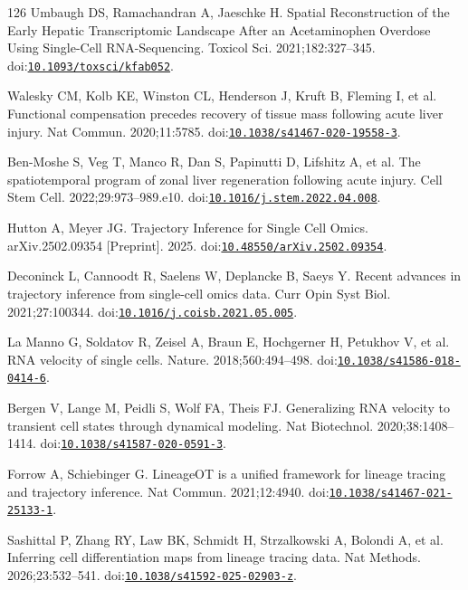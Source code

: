 \begin{thebibliography}{126}
Umbaugh DS, Ramachandran A, Jaeschke H. Spatial Reconstruction of the Early Hepatic Transcriptomic Landscape After an Acetaminophen Overdose Using Single-Cell RNA-Sequencing. Toxicol Sci. 2021;182:327--345. doi:\href{https://doi.org/10.1093/toxsci/kfab052}{\nolinkurl{10.1093/toxsci/kfab052}}.

Walesky CM, Kolb KE, Winston CL, Henderson J, Kruft B, Fleming I, et al. Functional compensation precedes recovery of tissue mass following acute liver injury. Nat Commun. 2020;11:5785. doi:\href{https://doi.org/10.1038/s41467-020-19558-3}{\nolinkurl{10.1038/s41467-020-19558-3}}.

Ben-Moshe S, Veg T, Manco R, Dan S, Papinutti D, Lifshitz A, et al. The spatiotemporal program of zonal liver regeneration following acute injury. Cell Stem Cell. 2022;29:973--989.e10. doi:\href{https://doi.org/10.1016/j.stem.2022.04.008}{\nolinkurl{10.1016/j.stem.2022.04.008}}.

Hutton A, Meyer JG. Trajectory Inference for Single Cell Omics. arXiv.2502.09354 [Preprint]. 2025. doi:\href{https://doi.org/10.48550/arXiv.2502.09354}{\nolinkurl{10.48550/arXiv.2502.09354}}.

Deconinck L, Cannoodt R, Saelens W, Deplancke B, Saeys Y. Recent advances in trajectory inference from single-cell omics data. Curr Opin Syst Biol. 2021;27:100344. doi:\href{https://doi.org/10.1016/j.coisb.2021.05.005}{\nolinkurl{10.1016/j.coisb.2021.05.005}}.

La Manno G, Soldatov R, Zeisel A, Braun E, Hochgerner H, Petukhov V, et al. RNA velocity of single cells. Nature. 2018;560:494--498. doi:\href{https://doi.org/10.1038/s41586-018-0414-6}{\nolinkurl{10.1038/s41586-018-0414-6}}.

Bergen V, Lange M, Peidli S, Wolf FA, Theis FJ. Generalizing RNA velocity to transient cell states through dynamical modeling. Nat Biotechnol. 2020;38:1408--1414. doi:\href{https://doi.org/10.1038/s41587-020-0591-3}{\nolinkurl{10.1038/s41587-020-0591-3}}.

Forrow A, Schiebinger G. LineageOT is a unified framework for lineage tracing and trajectory inference. Nat Commun. 2021;12:4940. doi:\href{https://doi.org/10.1038/s41467-021-25133-1}{\nolinkurl{10.1038/s41467-021-25133-1}}.

Sashittal P, Zhang RY, Law BK, Schmidt H, Strzalkowski A, Bolondi A, et al. Inferring cell differentiation maps from lineage tracing data. Nat Methods. 2026;23:532--541. doi:\href{https://doi.org/10.1038/s41592-025-02903-z}{\nolinkurl{10.1038/s41592-025-02903-z}}.


\end{thebibliography}
